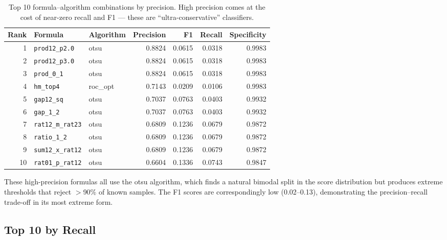 \documentclass[11pt,a4paper]{article}
\newcommand{\formula}[1]{\texttt{#1}}
\newcommand{\algo}[1]{\textsf{#1}}
\begin{document}
\begin{table}[htbp]
\centering
\caption{Top 10 formula--algorithm combinations by precision. High precision comes at the cost of near-zero recall and F1 --- these are ``ultra-conservative'' classifiers.}
\label{tab:top_precision}
\begin{tabular}{@{}rllrrrr@{}}
\toprule
\textbf{Rank} & \textbf{Formula} & \textbf{Algorithm} & \textbf{Precision} & \textbf{F1} & \textbf{Recall} & \textbf{Specificity} \\
\midrule
 1 & \formula{prod12\_p2.0} & otsu & 0.8824 & 0.0615 & 0.0318 & 0.9983 \\
 2 & \formula{prod12\_p3.0} & otsu & 0.8824 & 0.0615 & 0.0318 & 0.9983 \\
 3 & \formula{prod\_0\_1} & otsu & 0.8824 & 0.0615 & 0.0318 & 0.9983 \\
 4 & \formula{hm\_top4} & roc\_opt & 0.7143 & 0.0209 & 0.0106 & 0.9983 \\
 5 & \formula{gap12\_sq} & otsu & 0.7037 & 0.0763 & 0.0403 & 0.9932 \\
 6 & \formula{gap\_1\_2} & otsu & 0.7037 & 0.0763 & 0.0403 & 0.9932 \\
 7 & \formula{rat12\_m\_rat23} & otsu & 0.6809 & 0.1236 & 0.0679 & 0.9872 \\
 8 & \formula{ratio\_1\_2} & otsu & 0.6809 & 0.1236 & 0.0679 & 0.9872 \\
 9 & \formula{sum12\_x\_rat12} & otsu & 0.6809 & 0.1236 & 0.0679 & 0.9872 \\
10 & \formula{rat01\_p\_rat12} & otsu & 0.6604 & 0.1336 & 0.0743 & 0.9847 \\
\bottomrule
\end{tabular}
\end{table}

\noindent These high-precision formulas all use the \algo{otsu} algorithm, which finds a natural bimodal split in the score distribution but produces extreme thresholds that reject $>$90\% of known samples. The F1 scores are correspondingly low (0.02--0.13), demonstrating the precision--recall trade-off in its most extreme form.

\subsection{Top 10 by Recall}
\end{document}

